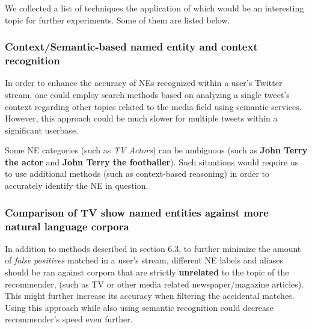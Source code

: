 We collected a list of techniques the application of which would be an
interesting topic for further experiments. Some of them are listed below.

\subsubsection{Context/Semantic-based named entity and context recognition}

In order to enhance the accuracy of NEs recognized within a user's Twitter
stream, one could employ search methods based on analyzing a single tweet's
context regarding other topics related to the media field using semantic
services.  However, this approach could be much slower for multiple tweets
within a significant userbase.

Some NE categories (such as \textit{TV Actors}) can be ambiguous
(such as \textbf{John Terry the actor} and \textbf{John Terry the footballer}).
Such situations would require us to use additional methods (such as context-based
reasoning) in order to accurately identify the NE in question.

\subsubsection{Comparison of TV show named entities against more natural language corpora}

In addition to methods described in section 6.3, to further minimize the amount of \textit{false positives}
matched in a user's stream, different NE labels and aliases should be ran against corpora
that are strictly \textbf{unrelated} to the topic of the recommender, (such as TV or other media related
newspaper/magazine articles). This might further increase its accuracy when filtering the accidental
matches. Using this approach while also using semantic recognition could decrease recommender's
speed even further.
